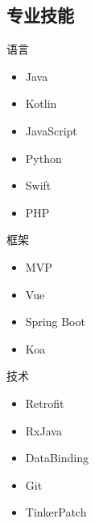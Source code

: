 \documentclass[11pt]{res}
\begin{document}
\begin{resume}
\section{专业技能}
  \begin{multicols}{3}
    语言
    \begin{itemize}
      \item Java
      \item Kotlin
      \item JavaScript
      \item Python
      \item Swift
      \item PHP
    \end{itemize}
    框架
    \begin{itemize}
      \item MVP
      \item Vue
      \item Spring Boot
      \item Koa
    \end{itemize}
    技术
    \begin{itemize}
      \item Retrofit
      \item RxJava
      \item DataBinding
      \item Git
      \item TinkerPatch
    \end{itemize}
  \end{multicols}


\end{resume}
\end{document}
